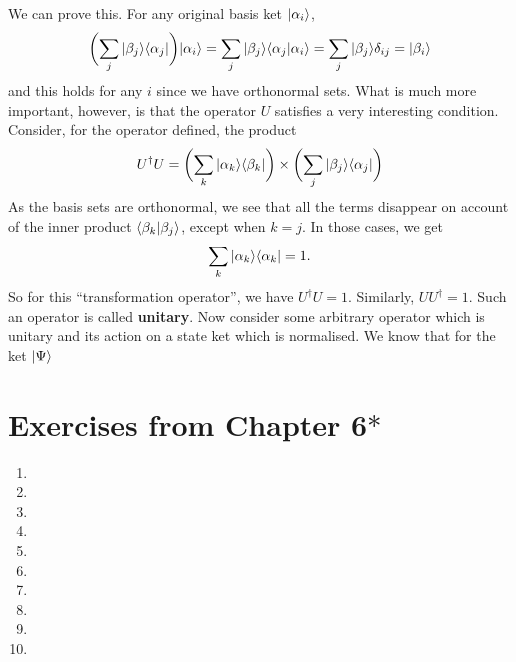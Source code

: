 We can prove this. For any original basis ket $|\alpha_{i}\rangle$,
$$
\biggl(\sum_{j}|\beta_{j}\rangle\langle\alpha_{j}|\biggr)|\alpha_{i}\rangle=\sum_{j}|\beta_{j}\rangle\langle\alpha_{j}|\alpha_{i}\rangle=\sum_{j}|\beta_{j}\rangle\delta_{ij}=|\beta_{i}\rangle
$$
and this holds for any $i$ since we have orthonormal sets. What is much more important, however, is that the operator $U$ satisfies a very interesting condition. Consider, for the operator defined, the product
$$
U^\dagger U=\biggl(\sum_{k}|\alpha_{k}\rangle\langle\beta_{k}|\biggr)\times\biggl(\sum_{j}|\beta_{j}\rangle\langle\alpha_{j}|\biggr)
$$
As the basis sets are orthonormal, we see that all the terms disappear on account of the inner product $\langle\beta_{k}|\beta_{j}\rangle$, except when $k=j$. In those cases, we get 
$$
\sum_{k}|\alpha_{k}\rangle\langle\alpha_{k}|=1.
$$
So for this ``transformation operator'', we have $U^{\dagger}U=1$. Similarly, $U U^{\dagger}=1$. Such an operator is called \textbf{unitary}. Now consider some arbitrary operator which is unitary and its action on a state ket which is normalised. We know that for the ket $|\Psi
\rangle$
\section{Exercises from Chapter 6$\ast$}
\begin{enumerate}
    \item 
    \item
    \item
    \item
    \item
    \item
    \item
    \item
    \item
    \item
\end{enumerate}
